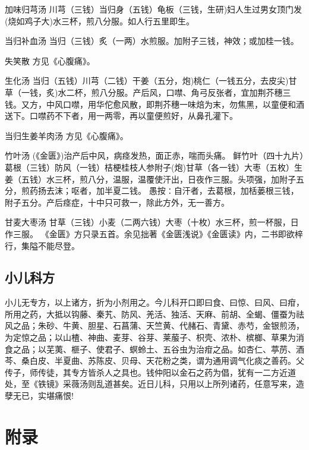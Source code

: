 \documentclass[a4paper,12pt,UTF8,twoside]{ctexbook}
\begin{document}
	加味归芎汤
	川芎（三钱）当归身（五钱）龟板（三钱，生研)妇人生过男女顶门发(烧如鸡子大)水三杯，煎八分服。如人行五里即生。
	
	当归补血汤
	当归（三钱）炙（一两）水煎服。加附子三钱，神效；或加桂一钱。
	
	失笑散
	方见《心腹痛》。
	
	生化汤
	当归（五钱）川芎（二钱）干姜（五分，炮)桃仁（一钱五分，去皮尖)甘草（一钱，炙)水二杯，煎八分服。产后风，口噤、角弓反张者，宜加荆芥穗三钱。又方，中风口噤，用华佗愈风散，即荆芥穗一味焙为末，勿焦黑，以童便和酒送下。口噤药不下者，用一两零，再以童便煎好，从鼻孔灌下。
	
	当归生姜羊肉汤
	方见《心腹痛》。
	
	竹叶汤
	(《金匮》)治产后中风，病痉发热，面正赤，喘而头痛。
	鲜竹叶（四十九片）葛根（三钱）防风（一钱）桔梗桂枝人参附子(炮)甘草（各一钱）大枣（五枚）生姜（五钱）水三杯，煎八分，温服，温覆使汗出，日夜作三服。头项强，加附子五分，煎药扬去沫；呕者，加半夏二钱。
	愚按∶自汗者，去葛根，加栝蒌根三钱，附子五分。产后痉症，十中只可救一，除此方外，无一善方。
	
	甘麦大枣汤
	甘草（三钱）小麦（二两六钱）大枣（十枚）水三杯，煎一杯服，日作三服。
	《金匮》方只录五首。余见拙著《金匮浅说》《金匮读》内，二书即欲梓行，集隘不能尽登。
	
	\chapter{小儿科方}
	    小儿无专方，以上诸方，折为小剂用之。今儿科开口即曰食、曰惊、曰风、曰疳，所用之药，大抵以钩藤、秦艽、防风、羌活、独活、天麻、前胡、全蝎、僵蚕为祛风之品；朱砂、牛黄、胆星、石菖蒲、天竺黄、代赭石、青黛、赤芍，金银煎汤，为定惊之品；以山楂、神曲、麦芽、谷芽、莱菔子、枳壳、浓朴、槟榔、草果为消食之品；以芜荑、榧子、使君子、螟蛉土、五谷虫为治疳之品。如杏仁、葶苈、酒芩、桑白皮、半夏曲、苏陈皮、贝母、天花粉之类，谓为通用调气化痰之善药。父传子，师传徒，其专方皆杀人之具也。钱仲阳以金石之药为倡，犹有一二方近道处，至《铁镜》采薇汤则乱道甚矣。近日儿科，只用以上所列诸药，任意写来，造孽无已，实堪痛恨!
	
	\part{附录}
\end{document}
